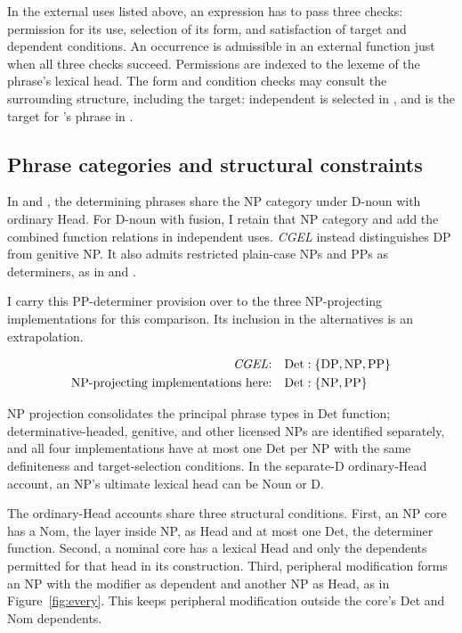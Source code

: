 \documentclass[12pt]{article}
\begin{document}
In the external uses listed above, an expression has to pass three checks: permission for its use, selection of its form, and satisfaction of target and dependent conditions. An occurrence is admissible in an external function just when all three checks succeed. Permissions are indexed to the lexeme of the phrase's lexical head. The form and condition checks may consult the surrounding structure, including the target: independent  is selected in , and  is the target for 's phrase in .

\subsection{Phrase categories and structural constraints}\label{sec:det-uniform}

In  and , the determining phrases share the NP category under D-noun with ordinary Head. For D-noun with fusion, I retain that NP category and add the combined function relations in independent uses. \textit{CGEL} instead distinguishes DP from genitive NP. It also admits restricted plain-case NPs and PPs as determiners, as in  and  \citep[Ch.~5, §4]{huddleston2002}.

I carry this PP-determiner provision over to the three NP-projecting implementations for this comparison. Its inclusion in the alternatives is an extrapolation.

\[
\begin{aligned}
\text{\textit{CGEL}:} &\quad \mathrm{Det}:\{\mathrm{DP},\mathrm{NP},\mathrm{PP}\} \\
\text{NP-projecting implementations here:} &\quad \mathrm{Det}:\{\mathrm{NP},\mathrm{PP}\}
\end{aligned}
\]

NP projection consolidates the principal phrase types in Det function; determinative-headed, genitive, and other licensed NPs are identified separately, and all four implementations have at most one Det per NP with the same definiteness and target-selection conditions. In the separate-D ordinary-Head account, an NP's ultimate lexical head can be Noun or D.

The ordinary-Head accounts share three structural conditions. First, an NP core has a Nom, the layer inside NP, as Head and at most one Det, the determiner function. Second, a nominal core has a lexical Head and only the dependents permitted for that head in its construction. Third, peripheral modification forms an NP with the modifier as dependent and another NP as Head, as in Figure~\ref{fig:every}. This keeps peripheral modification outside the core's Det and Nom dependents.
\end{document}
